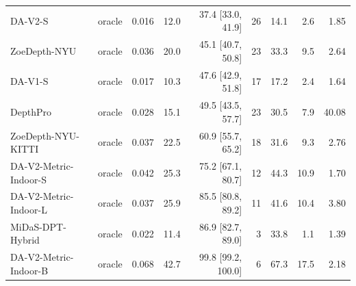\begin{tabular}{llrrrrrrr}
DA-V2-S & oracle & 0.016 & 12.0 & 37.4 [33.0, 41.9] & 26 & 14.1 & 2.6 & 1.85 \\
ZoeDepth-NYU & oracle & 0.036 & 20.0 & 45.1 [40.7, 50.8] & 23 & 33.3 & 9.5 & 2.64 \\
DA-V1-S & oracle & 0.017 & 10.3 & 47.6 [42.9, 51.8] & 17 & 17.2 & 2.4 & 1.64 \\
DepthPro & oracle & 0.028 & 15.1 & 49.5 [43.5, 57.7] & 23 & 30.5 & 7.9 & 40.08 \\
ZoeDepth-NYU-KITTI & oracle & 0.037 & 22.5 & 60.9 [55.7, 65.2] & 18 & 31.6 & 9.3 & 2.76 \\
DA-V2-Metric-Indoor-S & oracle & 0.042 & 25.3 & 75.2 [67.1, 80.7] & 12 & 44.3 & 10.9 & 1.70 \\
DA-V2-Metric-Indoor-L & oracle & 0.037 & 25.9 & 85.5 [80.8, 89.2] & 11 & 41.6 & 10.4 & 3.80 \\
MiDaS-DPT-Hybrid & oracle & 0.022 & 11.4 & 86.9 [82.7, 89.0] & 3 & 33.8 & 1.1 & 1.39 \\
DA-V2-Metric-Indoor-B & oracle & 0.068 & 42.7 & 99.8 [99.2, 100.0] & 6 & 67.3 & 17.5 & 2.18 \\
\bottomrule
\end{tabular}
